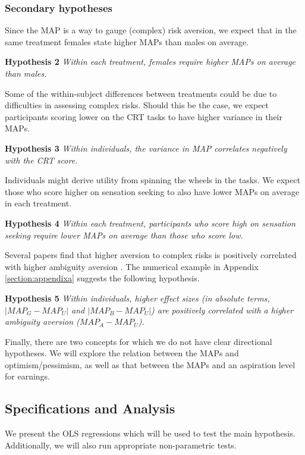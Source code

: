 \subsubsection{Secondary hypotheses}
Since the MAP is a way to gauge (complex) risk aversion, we expect that in the same treatment females state higher MAPs than males on average.

\noindent \textbf{Hypothesis 2} \quad \textit{Within each treatment, females require higher MAPs on average than males.}

Some of the within-subject differences between treatments could be due to difficulties in assessing complex risks.
Should this be the case, we expect participants scoring lower on the CRT tasks to have higher variance in their MAPs.

\noindent \textbf{Hypothesis 3} \quad \textit{Within individuals, the variance in MAP correlates negatively with the CRT score.}

Individuals might derive utility from spinning the wheels in the tasks.
We expect those who score higher on sensation seeking to also have lower MAPs on average in each treatment.

\noindent \textbf{Hypothesis 4} \quad \textit{Within each treatment, participants who score high on sensation seeking require lower MAPs on average than those who score low.}

Several papers find that higher aversion to complex risks is positively correlated with higher ambiguity aversion \citep{Halevy2007,Armantier2016}.
The numerical example in Appendix \ref{section:appendixa} suggests the following hypothesis.

\noindent \textbf{Hypothesis 5} \quad \textit{Within individuals, higher effect sizes (in absolute terms, $|MAP_G - MAP_U|$ and $|MAP_B - MAP_U|$) are positively correlated with a higher ambiguity aversion ($MAP_A - MAP_U$).}

Finally, there are two concepts for which we do not have clear directional hypotheses.
We will explore the relation between the MAPs and optimism/pessimism, as well as that between the MAPs and an aspiration level for earnings.




\subsection{Specifications and Analysis}
We present the OLS regressions which will be used to test the main hypothesis.
Additionally, we will also run appropriate non-parametric tests.

